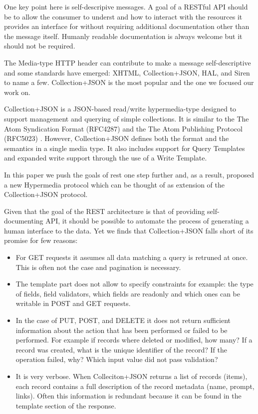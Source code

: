 \documentclass[12pt]{article}
\begin{document}
One key point here is self-descripive messages. 
A goal of a RESTful API should be to allow the consumer to underst and how
to interact with the resources it provides an interface for without requiring
additional documentation other than the message itself. Humanly readable documentation is
always welcome but it should not be required.

The Media-type HTTP header can contribute to make a message self-descriptive and some standards have emerged: XHTML, Collection+JSON, HAL, and Siren to name a few. Collection+JSON is the most popular and the one we focused our work on.

Collection+JSON is a JSON-based read/write hypermedia-type designed to support management and querying of simple collections. It is similar to the The Atom Syndication Format (RFC4287) and the The Atom Publishing Protocol (RFC5023) . However, Collection+JSON defines both the format and the semantics in a single media type. It also includes support for Query Templates and expanded write support through the use of a Write Template.

In this paper we push the goals of rest one step further and, as a result, proposed a new Hypermedia protocol which can be thought of as extension of the Collection+JSON protocol.

Given that the goal of the REST architecture is that of providing self-documenting API, it should be possible to automate the process of generating a human interface to the data. Yet we finds that Collection+JSON falls short of its promise for few reasons:

\begin{itemize}
\item For GET requests it assumes all data matching a query is retruned at once. This is often not the case and pagination is necessary.
\item The template part does not allow to specify constraints for example: the type of fields, field validators, which fields are readonly and which ones can be writable in POST and GET requests.
\item In the case of PUT, POST, and DELETE it does not return sufficient information about the action that has been performed or failed to be performed. For example if records where deleted or modified, how many? If a record was created, what is the unique identifier of the record? If the operation failed, why? Which input value did not pass validation?
\item It is very verbose. When Colleciton+JSON returns a list of records (items), each record contains a full description of the record metadata (name, prompt, links). Often this information is redundant because it can be found in the template section of the response.
\end{itemize}
\end{document}
